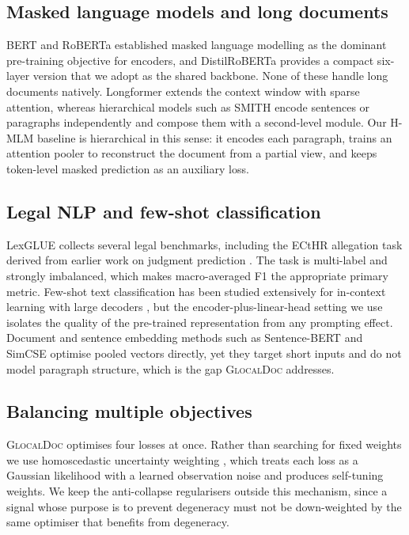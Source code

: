 \documentclass[conference]{IEEEtran}
\newcommand{\glocal}{\textsc{GlocalDoc}}
\newcommand{\hmlm}{\mbox{H-MLM}}
\begin{document}
\subsection{Masked language models and long documents}
BERT \cite{devlin2019bert} and RoBERTa \cite{liu2019roberta} established masked
language modelling as the dominant pre-training objective for encoders, and
DistilRoBERTa \cite{sanh2019distilbert} provides a compact six-layer version that we
adopt as the shared backbone. None of these handle long documents natively.
Longformer \cite{beltagy2020longformer} extends the context window with sparse
attention, whereas hierarchical models such as SMITH \cite{yang2020beyond} encode
sentences or paragraphs independently and compose them with a second-level module.
Our \hmlm{} baseline is hierarchical in this sense: it encodes each paragraph,
trains an attention pooler to reconstruct the document from a partial view, and
keeps token-level masked prediction as an auxiliary loss.

\subsection{Legal NLP and few-shot classification}
LexGLUE \cite{chalkidis2022lexglue} collects several legal benchmarks, including the
ECtHR allegation task derived from earlier work on judgment prediction
\cite{chalkidis2019neural}. The task is multi-label and strongly imbalanced, which
makes macro-averaged F1 the appropriate primary metric. Few-shot text
classification has been studied extensively for in-context learning with large
decoders \cite{brown2020language}, but the encoder-plus-linear-head setting we use
isolates the quality of the pre-trained representation from any prompting effect.
Document and sentence embedding methods such as Sentence-BERT
\cite{reimers2019sentence} and SimCSE \cite{gao2021simcse} optimise pooled vectors
directly, yet they target short inputs and do not model paragraph structure, which
is the gap \glocal{} addresses.

\subsection{Balancing multiple objectives}
\glocal{} optimises four losses at once. Rather than searching for fixed weights we
use homoscedastic uncertainty weighting \cite{kendall2018multi}, which treats each
loss as a Gaussian likelihood with a learned observation noise and produces
self-tuning weights. We keep the anti-collapse regularisers outside this mechanism,
since a signal whose purpose is to prevent degeneracy must not be down-weighted by
the same optimiser that benefits from degeneracy.
\end{document}
